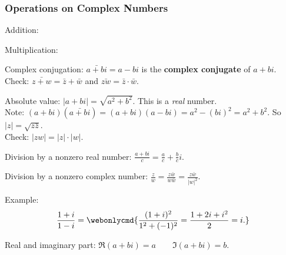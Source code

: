\begin{frame}
\frametitle{Operations on Complex Numbers}

\alert{Addition:}

\medskip
\alert{Multiplication:}

\pause\medskip
\alert{Complex conjugation:} 
$\bar{a+bi} = a-bi$ is the \textbf{complex conjugate} of $a+bi$.\\
\pause
\alert{Check:} $\bar{z+w} = \bar z + \bar w$ and $\bar{zw} = \bar z\cdot\bar w$.

\pause\medskip
\alert{Absolute value:}
$|a+bi| = \sqrt{a^2+b^2}$.
\pause
This is a \emph{real} number.\\
\pause
\alert{Note:} $(a+bi)(\bar{a+bi}) = (a+bi)(a-bi) = a^2 - (bi)^2 = a^2+b^2$.
\pause
So $|z| = \sqrt{z\bar z}$.\\
\pause
\alert{Check:}
$|zw| = |z|\cdot|w|$.

\pause\medskip
\alert{Division by a nonzero real number:}
$\displaystyle\frac{a+bi}c = \frac ac + \frac bci$.

\pause\medskip
\alert{Division by a nonzero complex number:}
$\displaystyle\frac zw = \frac{z\bar w}{w\bar w} = \frac{z\bar w}{|w|^2}$.

\pause\medskip
\alert{Example:}
\[ \frac{1+i}{1-i} = \webonlycmd{\frac{(1+i)^2}{1^2+(-1)^2} = \frac{1+2i+i^2}2 = i.} \]

\pause\medskip
\alert{Real and imaginary part:}
$\Re(a+bi) = a \qquad \Im(a+bi) = b$.

\end{frame}



